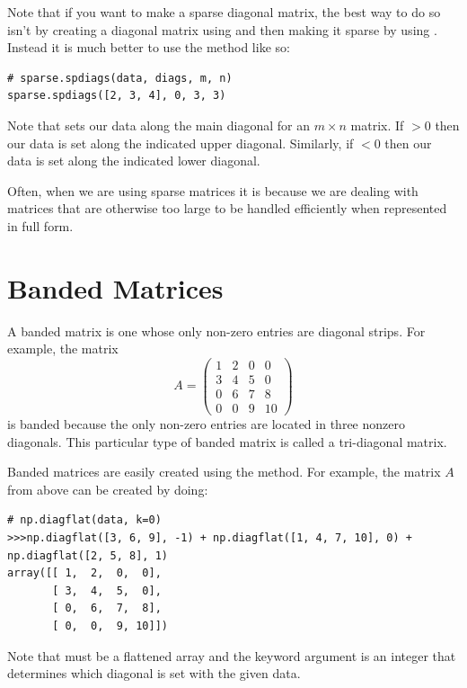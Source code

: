Note that if you want to make a sparse diagonal matrix, the best way to do so isn't by creating a diagonal matrix using  and then making it sparse by using . Instead it is much better to use the  method like so:

\begin{lstlisting}
# sparse.spdiags(data, diags, m, n)
sparse.spdiags([2, 3, 4], 0, 3, 3) 
\end{lstlisting}

Note that  sets our data along the main diagonal for an $m \times n$ matrix. If  $> 0$ then our data is set along the indicated upper diagonal. Similarly, if  $< 0$ then our data is set along the indicated lower diagonal. 

Often, when we are using sparse matrices it is because we are dealing with matrices that are otherwise too large to be handled efficiently when represented in full form.


\section*{Banded Matrices}
A banded matrix is one whose only non-zero entries are diagonal
strips.  For example, the matrix
\begin{equation*}
A = \begin{pmatrix}
1 & 2 & 0 & 0 \\
3 & 4 & 5 & 0 \\
0 & 6 & 7 & 8 \\
0 & 0 & 9 & 10
\end{pmatrix}
\end{equation*}
is banded because the only non-zero entries are located in three nonzero diagonals.  This particular type of banded matrix is called a tri-diagonal matrix.

Banded matrices are easily created using the  method.
For example, the matrix $A$ from above can be created by doing:

\begin{lstlisting}
# np.diagflat(data, k=0)
>>>np.diagflat([3, 6, 9], -1) + np.diagflat([1, 4, 7, 10], 0) + np.diagflat([2, 5, 8], 1) 
array([[ 1,  2,  0,  0],
       [ 3,  4,  5,  0],
       [ 0,  6,  7,  8],
       [ 0,  0,  9, 10]])

\end{lstlisting}
Note that  must be a flattened array and the keyword argument  is an integer that determines which diagonal is set with the given data. 

